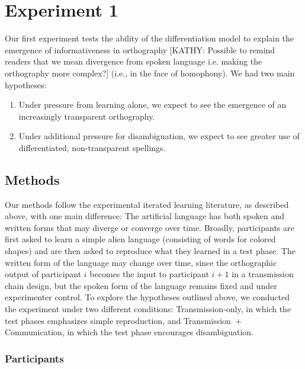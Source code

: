 \documentclass[doc,biblatex]{apa7}
\begin{document}

\section{Experiment 1}

Our first experiment tests the ability of the differentiation model to explain the emergence of informativeness in orthography [KATHY: Possible to remind readers that we mean divergence from spoken language i.e. making the orthography more complex?] (i.e., in the face of homophony). We had two main hypotheses:
\begin{enumerate}
	\item Under pressure from learning alone, we expect to see the emergence of an increasingly transparent orthography.
	\item Under additional pressure for disambiguation, we expect to see greater use of differentiated, non-transparent spellings.
\end{enumerate}

\subsection{Methods}

Our methods follow the experimental iterated learning literature, as described above, with one main difference: The artificial language has both spoken and written forms that may diverge or converge over time. Broadly, participants are first asked to learn a simple alien language (consisting of words for colored shapes) and are then asked to reproduce what they learned in a test phase. The written form of the language may change over time, since the orthographic output of participant $i$ becomes the input to participant $i+1$ in a transmission chain design, but the spoken form of the language remains fixed and under experimenter control. To explore the hypotheses outlined above, we conducted the experiment under two different conditions: Transmission-only, in which the test phases emphasizes simple reproduction, and Transmission~+ Communication, in which the test phase encourages disambiguation.

\subsubsection{Participants}
\end{document}
